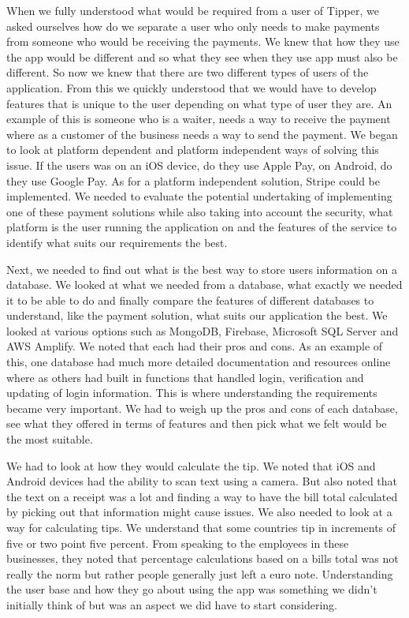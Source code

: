 When we fully understood what would be required from a user of Tipper, we asked ourselves how do we separate a user who only needs to make payments from someone who would be receiving the payments. We knew that how they use the app would be different and so what they see when they use app must also be different. So now we knew that there are two different types of users of the application. From this we quickly understood that we would have to develop features that is unique to the user depending on what type of user they are. An example of this is someone who is a waiter, needs a way to receive the payment where as a customer of the business needs a way to send the payment. We began to look at platform dependent and platform independent ways of solving this issue. If the users was on an iOS device, do they use Apple Pay, on Android, do they use Google Pay. As for a platform independent solution, Stripe could be implemented. We needed to evaluate the potential undertaking of implementing one of these payment solutions while also taking into account the security, what platform is the user running the application on and the features of the service to identify what suits our requirements the best.

Next, we needed to find out what is the best way to store users information on a database. We looked at what we needed from a database, what exactly we needed it to be able to do and finally compare the features of different databases to understand, like the payment solution, what suits our application the best. We looked at various options such as MongoDB, Firebase, Microsoft SQL Server and AWS Amplify. We noted that each had their pros and cons. As an example of this, one database had much more detailed documentation and resources online where as others had built in functions that handled login, verification and updating of login information. This is where understanding the requirements became very important. We had to weigh up the pros and cons of each database, see what they offered in terms of features and then pick what we felt would be the most suitable.

We had to look at how they would calculate the tip. We noted that iOS and Android devices had the ability to scan text using a camera. But also noted that the text on a receipt was a lot and finding a way to have the bill total calculated by picking out that information might cause issues. We also needed to look at a way for calculating tips. We understand that some countries tip in increments of five or two point five percent. From speaking to the employees in these businesses, they noted that percentage calculations based on a bills total was not really the norm but rather people generally just left a euro note. Understanding the user base and how they go about using the app was something we didn't initially think of but was an aspect we did have to start considering.

